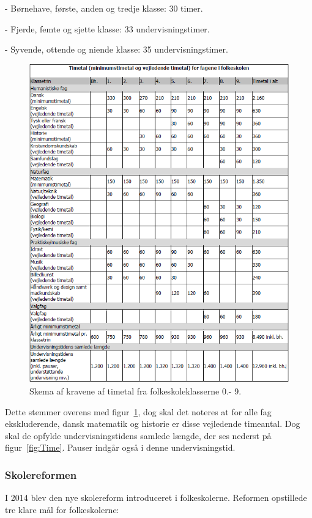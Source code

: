 -         Børnehave, første, anden og tredje klasse: 30 timer.

-         Fjerde, femte og sjette klasse: 33 undervisningstimer.

-         Syvende, ottende og niende klasse: 35 undervisningstimer.

\begin{figure}[!ht]
  \centering
  \includegraphics[width=\textwidth]{partials/graphics/overallskemaovertimetal.png}
  \caption{Skema af kravene af timetal fra folkeskoleklasserne 0.- 9.}
  \label{fig:Timetal}
\end{figure}

Dette stemmer overens med figur~\ref{fig:Timetal}, dog skal det noteres at for alle fag ekskluderende, dansk matematik og historie  er disse vejledende timeantal. Dog skal de opfylde undervisningstidens samlede længde, der ses nederst på figur~\ref{fig:Time}. Pauser indgår også i denne undervisningstid.
 	
\subsubsection{Skolereformen}
I 2014 blev den nye skolereform introduceret i folkeskolerne. Reformen opstillede tre klare mål for folkeskolerne:

